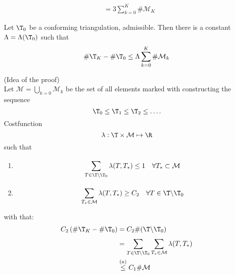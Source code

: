 \begin{enumerate}[label = \alph*)]
\begin{align*}
									&= 3 \sum\limits_{k=0}^{K} \#\mathcal{M}_{K} 
		\end{align*}
		\begin{theorem}
			Let $\T_{0}$ be a conforming triangulation, admissible. Then there is a constant $\Lambda = \Lambda(\T_{0})$ such that 
			\begin{equation*}
				\# \T_{K} - \# \T_{0} \leq \Lambda \sum\limits_{k=0}^{K} \#\mathcal{M}_{k}
			\end{equation*}
		\end{theorem}
		\begin{proof_}
			(Idea of the proof)\\
			Let $\mathcal{M} = \bigcup_{k=0} \mathcal{M}_{k}$ be the set of all elements marked with constructing the sequence
			 \begin{equation*}
				\T_{0} \leq \T_{1} \leq \T_{2}\leq \dots .
			\end{equation*}
			Costfunction
			\begin{equation*}
				\lambda: \T \times \mathcal{M} \mapsto \R
			\end{equation*}
			such that
			\begin{enumerate}[label = \alph*)]
				\item 
					\begin{equation*}
						\sum\limits_{T \in \T\backslash \T_{0}}^{} \lambda(T,T_{*}) \leq 1 \quad \forall T_{*} \subset \mathcal{M}
					\end{equation*}
				\item 
					\begin{equation*}
						\sum\limits_{T_{*}\in \mathcal{M}}^{} \lambda(T,T_{*}) \geq C_{2} \quad \forall T \in \T \backslash \T_{0}
					\end{equation*}
			\end{enumerate}
			with that:
			\begin{align*}
				C_{2} \left( \# \T_{K} - \# \T_{0} \right) &= C_{2}\# (\T\backslash \T_{0}) \\
														   &= \sum\limits_{T \in \T \backslash \T_{0} }^{} \sum\limits_{T_{*} \in \mathcal{M}}^{} \lambda(T,T_{*})\\
														   &\overset{(a)}{\leq} C_{1} \# \mathcal{M}
			\end{align*}
		\end{proof_}
\end{enumerate}

